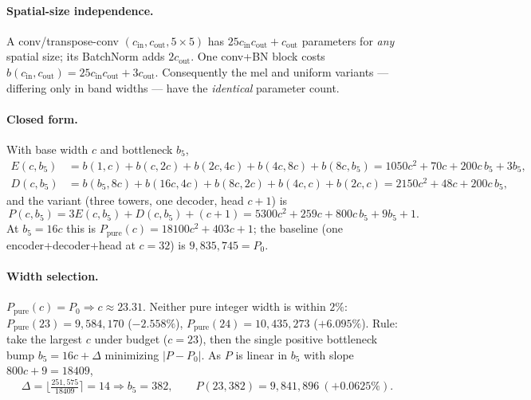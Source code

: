\documentclass[11pt]{article}
\begin{document}
\paragraph{Spatial-size independence.} A conv/transpose-conv $(c_{\text{in}},
c_{\text{out}},5\times5)$ has $25c_{\text{in}}c_{\text{out}}+c_{\text{out}}$
parameters for \emph{any} spatial size; its BatchNorm adds $2c_{\text{out}}$. One
conv+BN block costs $b(c_{\text{in}},c_{\text{out}})=25c_{\text{in}}c_{\text{out}}
+3c_{\text{out}}$. Consequently the mel and uniform variants --- differing only in
band widths --- have the \emph{identical} parameter count.

\paragraph{Closed form.} With base width $c$ and bottleneck $b_5$,
\begin{align*}
E(c,b_5)&=b(1,c)+b(c,2c)+b(2c,4c)+b(4c,8c)+b(8c,b_5)=1050c^2+70c+200c\,b_5+3b_5,\\
D(c,b_5)&=b(b_5,8c)+b(16c,4c)+b(8c,2c)+b(4c,c)+b(2c,c)=2150c^2+48c+200c\,b_5,
\end{align*}
and the variant (three towers, one decoder, head $c+1$) is
\[
\boxed{\,P(c,b_5)=3E(c,b_5)+D(c,b_5)+(c+1)=5300c^2+259c+800c\,b_5+9b_5+1.\,}
\]
At $b_5=16c$ this is $P_{\text{pure}}(c)=18100c^2+403c+1$; the baseline (one
encoder+decoder+head at $c=32$) is $9{,}835{,}745=P_0$.

\paragraph{Width selection.} $P_{\text{pure}}(c)=P_0\Rightarrow c\approx23.31$.
Neither pure integer width is within $2\%$: $P_{\text{pure}}(23)=9{,}584{,}170$
($-2.558\%$), $P_{\text{pure}}(24)=10{,}435{,}273$ ($+6.095\%$). Rule: take the
largest $c$ under budget ($c=23$), then the single positive bottleneck bump
$b_5=16c+\Delta$ minimizing $|P-P_0|$. As $P$ is linear in $b_5$ with slope
$800c+9=18409$,
\[
\Delta=\Big\lfloor\tfrac{251{,}575}{18409}\Big\rceil=14\Rightarrow b_5=382,\qquad
P(23,382)=9{,}841{,}896\ (+0.0625\%).
\]
\end{document}
